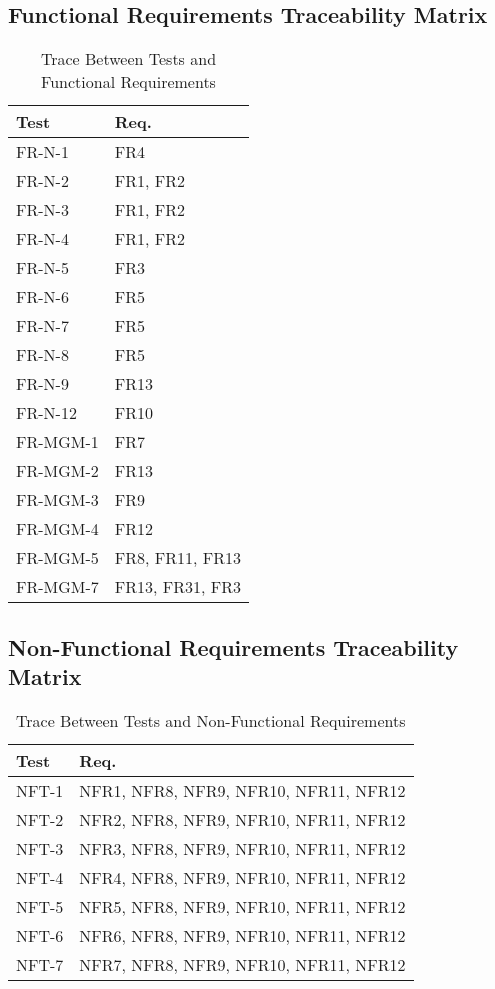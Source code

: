 \documentclass[12pt, titlepage]{article}
\begin{document}
\subsection{Functional Requirements Traceability Matrix}
\begin{table}[H]
\centering
\begin{tabular}{p{} p{}}
\toprule
\textbf{Test} & \textbf{Req.}\\
\midrule
FR-N-1 & FR4\\
FR-N-2 & FR1, FR2\\
FR-N-3 & FR1, FR2\\
FR-N-4 & FR1, FR2\\
FR-N-5 & FR3\\
FR-N-6 & FR5\\
FR-N-7 & FR5\\
FR-N-8 & FR5\\
FR-N-9 & FR13\\
FR-N-12 & FR10\\
FR-MGM-1 & FR7\\
FR-MGM-2 & FR13\\
FR-MGM-3 & FR9\\
FR-MGM-4 & FR12\\
FR-MGM-5 & FR8, FR11, FR13\\
FR-MGM-7 & FR13, FR31, FR3\\
\bottomrule
\end{tabular}
\caption{Trace Between Tests and Functional Requirements}
\label{TblTFR}
\end{table}

\newpage

\subsection{Non-Functional Requirements Traceability Matrix}
\begin{table}[H]
\centering
\begin{tabular}{p{} p{}}
\toprule
\textbf{Test} & \textbf{Req.}\\
\midrule
NFT-1 & NFR1, NFR8, NFR9, NFR10, NFR11, NFR12\\
NFT-2 & NFR2, NFR8, NFR9, NFR10, NFR11, NFR12\\
NFT-3 & NFR3, NFR8, NFR9, NFR10, NFR11, NFR12\\
NFT-4 & NFR4, NFR8, NFR9, NFR10, NFR11, NFR12\\
NFT-5 & NFR5, NFR8, NFR9, NFR10, NFR11, NFR12\\
NFT-6 & NFR6, NFR8, NFR9, NFR10, NFR11, NFR12\\
NFT-7 & NFR7, NFR8, NFR9, NFR10, NFR11, NFR12\\
\bottomrule
\end{tabular}
\caption{Trace Between Tests and Non-Functional Requirements}
\label{TblTNFR}
\end{table}
\end{document}
